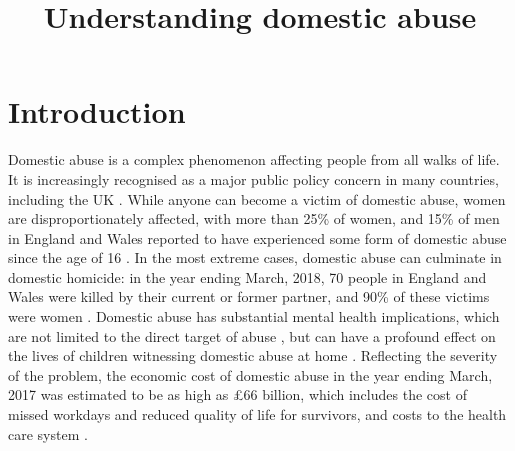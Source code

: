 \documentclass[11pt, a4paper]{article}
\begin{document}
\title{Understanding domestic abuse}
\date{}
\maketitle

\section{Introduction}

Domestic abuse is a complex phenomenon affecting people from all walks of life. It is increasingly recognised as a major public policy concern in many countries, including the UK \cite{ep}. While anyone can become a victim of domestic abuse, women are disproportionately affected, with more than 25\% of women, and 15\% of men in England and Wales reported to have experienced some form of domestic abuse since the age of 16 \cite{ONS}. In the most extreme cases, domestic abuse can culminate in domestic homicide: in the year ending March, 2018, 70 people in England and Wales were killed by their current or former partner, and 90\% of these victims were women \cite{homic}. Domestic abuse has substantial mental health implications, which are not limited to the direct target of abuse \cite{ferrari}, but can have a profound effect on the lives of children witnessing domestic abuse at home \cite{callaghan}. Reflecting the severity of the problem, the economic cost of domestic abuse in the year ending March, 2017 was estimated to be as high as \pounds 66 billion, which includes the cost of missed workdays and reduced quality of life for survivors, and costs to the health care system \cite{costs}.



\end{document}

